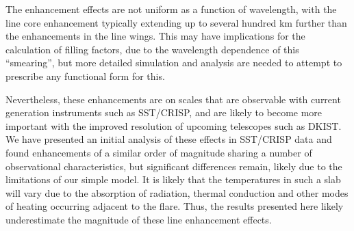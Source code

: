 The enhancement effects are not uniform as a function of wavelength, with the line core enhancement typically extending up to several hundred \si{\kilo\metre} further than the enhancements in the line wings.
This may have implications for the calculation of filling factors, due to the wavelength dependence of this ``smearing'', but more detailed simulation and analysis are needed to attempt to prescribe any functional form for this.

Nevertheless, these enhancements are on scales that are observable with current generation instruments such as SST/CRISP, and are likely to become more important with the improved resolution of upcoming telescopes such as DKIST.
We have presented an initial analysis of these effects in SST/CRISP data and found enhancements of a similar order of magnitude sharing a number of observational characteristics, but significant differences remain, likely due to the limitations of our simple model.
It is likely that the temperatures in such a slab will vary due to the absorption of radiation, thermal conduction and other modes of heating occurring adjacent to the flare.
Thus, the results presented here likely underestimate the magnitude of these line enhancement effects.